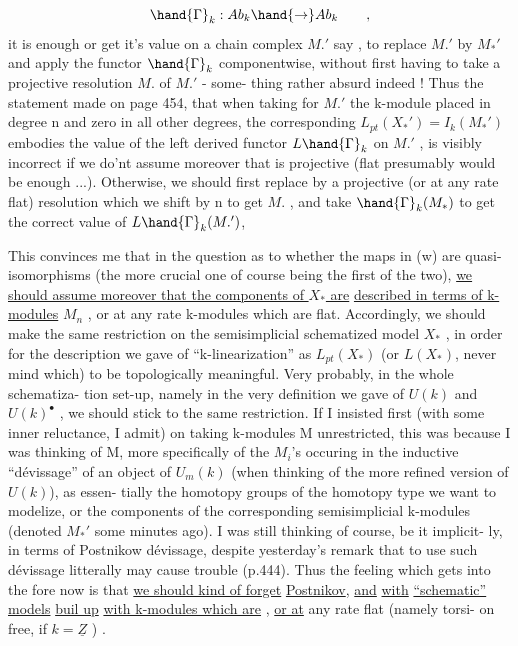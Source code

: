 
\[ \hand{\Gamma}_k : Ab_k \hand{\to} Ab_k \qquad , \]
it is enough\hand{,} or get it's value on a chain complex  $M.'$ say ,
to replace  $M.'$ by $M_*'$ and apply the functor $\hand{\Gamma}_k$ componentwise,
without first having to take a projective resolution $M.$ of $M.'$ - some-%
thing rather absurd indeed ! Thus the statement made on page 454, that
when taking for $M.'$ the k-module \hand{$\pi$} placed in degree n and zero in all
other degrees, the corresponding $L_{pt}(X_*') = I_k(M_*')$ embodies the
value of the left derived functor $L\hand{\Gamma}_k$ on $M.'$ , is visibly incorrect if
we do'nt assume moreover that \hand{$\pi$} is projective (flat presumably would be
enough ...). Otherwise, we should first replace \hand{$\pi$} by a projective
(or at any rate flat) resolution\hand{,} which we shift by n to get $M.$ , and 
take $\hand{\Gamma}_k(M_*)$ to get the correct value of $L\hand{\Gamma}_k(M.')$,

This convinces me that in the question as to whether the maps in (w)
are quasi-isomorphisms (the more crucial one of course being the first
of the two), \uline{we should assume moreover that the components of $X_*$ are}
\uline{described in terms of }\uline{ k-modules} $M_n$ , or at any rate k-modules
which are flat. Accordingly, we should make the same restriction on
the semisimplicial schematized model $X_*$ , in order for the description
we gave of ``k-linearization'' as $L_{pt}(X_*)$ (or $L(X_*)$, never mind which)
to be topologically meaningful. Very probably, in the whole schematiza-%
tion set-up, namely in the very definition we gave of $U(k)$ and $U(k)^\bullet$ ,
we should stick to the same restriction. If  I insisted
first (with some inner reluctance, I admit) on taking k-modules M
unrestricted, this was because I was thinking of M, more specifically
of the $M_i$'s occuring in the inductive ``dévissage'' of an object of
$U_m(k)$ (when thinking of the more refined version of $U(k)$), as essen-%
tially the homotopy groups of the homotopy type we want to modelize,
or  the components of the corresponding semisimplicial k-modules (denoted
$M_*'$ some minutes ago). I was still thinking of course, be it implicit-%
ly, in terms of Postnikow dévissage, despite yesterday's remark that
to use such dévissage litterally may cause trouble (p.444). Thus the
feeling which gets into the fore now is that \uline{we should kind of forget}
\uline{Postnikov}, \uline{and}   \uline{with} \uline{} \uline{``schematic''} \uline{models} \uline{buil up}
\uline{with k-modules which are} , \uline{or at} any rate flat (namely torsi-%
on free, if $k=\underline{Z}$ ) .


